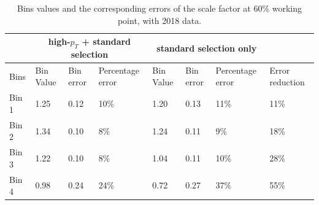 \documentclass[letterpaper,12pt]{article}
\begin{document}
 \begin{table}[h]
 \begin{centering}
 \begin{tabular}{|p{2.5em}||p{2.5em}|p{2.5em}|p{5em}||p{2.5em}|p{2.5em}|p{5em}||p{5em}|}
          \hline
          & \multicolumn{3}{|c||}{high-$p_{T}$ + standard selection} & \multicolumn{3}{|c||}{standard selection only} & \\  \hline\hline
          Bins& Bin Value &Bin error&Percentage error&Bin Value &Bin error&Percentage error & Error reduction\\ \hline
          Bin 1 & 1.25 & 0.12 & 10\% &1.20 & 0.13 & 11\% & 11\% \\ \hline
          Bin 2 & 1.34 & 0.10 & 8\% & 1.24 & 0.11 & 9\% & 18\% \\ \hline
          Bin 3 & 1.22 & 0.10 & 8\% & 1.04 & 0.11 & 10\% & 28\% \\ \hline
          Bin 4 & 0.98 & 0.24 & 24\% & 0.72 & 0.27 & 37\% & 55\% \\ \hline
          
 
 \end{tabular} 
 \caption{Bins values and the corresponding errors of the scale factor at 60\% working point, with 2018 data.}
 \end{centering}
 \label{tab:limit}
 \end{table}

\fi

\newpage
\printbibliography

\end{document}
